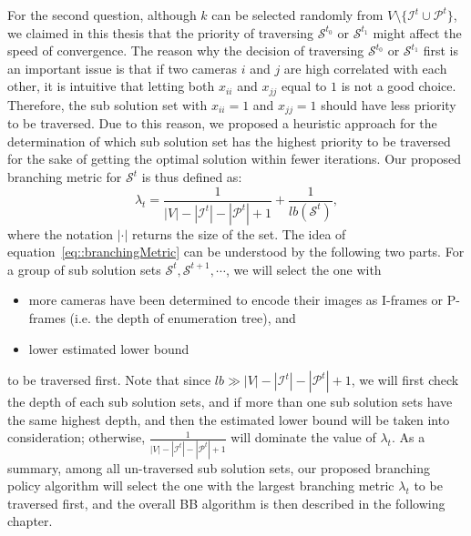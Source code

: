 For the second question, although $k$ can be selected randomly from $ V \setminus \{\mathcal{I}^t \cup \mathcal{P}^t\}$, we claimed in this thesis that the priority of traversing $\mathcal{S}^{t_0}$ or $\mathcal{S}^{t_1}$ might affect the speed of convergence.
The reason why the decision of traversing $\mathcal{S}^{t_0}$ or $\mathcal{S}^{t_1}$ first is an important issue is that if two cameras $i$ and $j$ are high correlated with each other, it is intuitive that letting both $x_{ii}$ and $x_{jj}$ equal to $1$ is not a good choice.
%
Therefore, the sub solution set with $x_{ii}=1$ and $x_{jj}=1$ should have less priority to be traversed.
Due to this reason, we proposed a heuristic approach for the determination of which sub solution set has the highest priority to be traversed for the sake of getting the optimal solution within fewer iterations.
Our proposed branching metric for $\mathcal{S}^t$ is thus defined as:
\begin{equation}
\lambda_t = \frac{1}{|V|-|\mathcal{I}^t|-|\mathcal{P}^t|+1}+\frac{1}{lb(\mathcal{S}^t)},
\label{eq::branchingMetric}
\end{equation}
where the notation $|\cdot|$ returns the size of the set.
The idea of equation~\eqref{eq::branchingMetric} can be understood by the following two parts.
For a group of sub solution sets $\mathcal{S}^t, \mathcal{S}^{t+1}, \cdots$, we will select the one with
\begin{itemize}
\item more cameras have been determined to encode their images as I-frames or P-frames (i.e. the depth of enumeration tree), and
\item  lower estimated lower bound
\end{itemize}
to be traversed first.
Note that since $lb \gg |V|-|\mathcal{I}^t|-|\mathcal{P}^t|+1$, we will first check the depth of each sub solution sets, and if more than one sub solution sets have the same highest depth, and then the estimated lower bound will be taken into consideration; otherwise, $\frac{1}{|V|-|\mathcal{I}^t|-|\mathcal{P}^t|+1}$ will dominate the value of $\lambda_t$.
As a summary, among all un-traversed sub solution sets, our proposed branching policy algorithm will select the one with the largest branching metric $\lambda_t$ to be traversed first, and the overall BB algorithm is then described in the following chapter.
%

